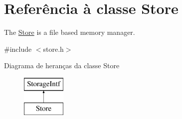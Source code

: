 \hypertarget{class_store}{\section{Referência à classe Store}
\label{class_store}
}


The \hyperlink{class_store}{Store} is a file based memory manager.  




{\ttfamily \#include $<$store.\-h$>$}

Diagrama de heranças da classe Store\begin{figure}[H]
\begin{center}
\leavevmode
\includegraphics[height=2.000000cm]{class_store}
\end{center}
\end{figure}
